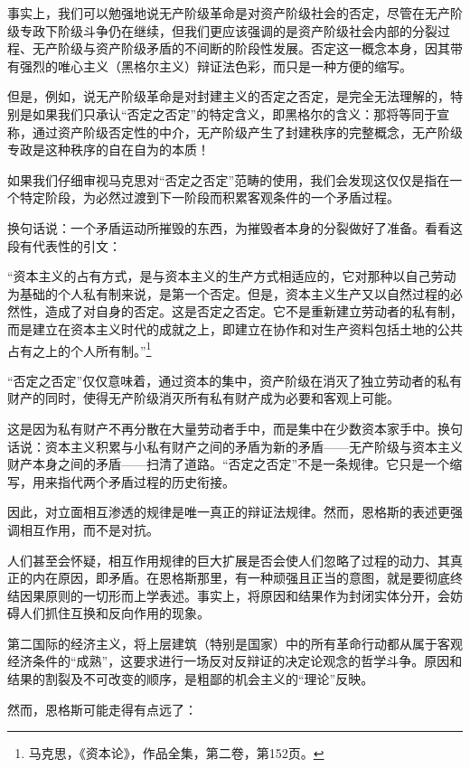 \documentclass[fontset=fandol, a4paper, 12pt, twoside]{ctexart}
\renewenvironment{quote}
  {\list{}{\rightmargin=0cm \leftmargin=2em}%
   \item\relax\small\kaishu\color{black}}
  {\endlist}
\begin{document}
事实上，我们可以勉强地说无产阶级革命是对资产阶级社会的否定，尽管在无产阶级专政下阶级斗争仍在继续，但我们更应该强调的是资产阶级社会内部的分裂过程、无产阶级与资产阶级矛盾的不间断的阶段性发展。否定这一概念本身，因其带有强烈的唯心主义（黑格尔主义）辩证法色彩，而只是一种方便的缩写。

但是，例如，说无产阶级革命是对封建主义的否定之否定，是完全无法理解的，特别是如果我们只承认“否定之否定”的特定含义，即黑格尔的含义：那将等同于宣称，通过资产阶级否定性的中介，无产阶级产生了封建秩序的完整概念，无产阶级专政是这种秩序的自在自为的本质！

如果我们仔细审视马克思对“否定之否定”范畴的使用，我们会发现这仅仅是指在一个特定阶段，为必然过渡到下一阶段而积累客观条件的一个矛盾过程。

换句话说：一个矛盾运动所摧毁的东西，为摧毁者本身的分裂做好了准备。看看这段有代表性的引文：

\begin{quote}
“资本主义的占有方式，是与资本主义的生产方式相适应的，它对那种以自己劳动为基础的个人私有制来说，是第一个否定。但是，资本主义生产又以自然过程的必然性，造成了对自身的否定。这是否定之否定。它不是重新建立劳动者的私有制，而是建立在资本主义时代的成就之上，即建立在协作和对生产资料包括土地的公共占有之上的个人所有制。”\footnote{马克思，《资本论》，作品全集，第二卷，第152页。}
\end{quote}

“否定之否定”仅仅意味着，通过资本的集中，资产阶级在消灭了独立劳动者的私有财产的同时，使得无产阶级消灭所有私有财产成为必要和客观上可能。

这是因为私有财产不再分散在大量劳动者手中，而是集中在少数资本家手中。换句话说：资本主义积累与小私有财产之间的矛盾为新的矛盾——无产阶级与资本主义财产本身之间的矛盾——扫清了道路。“否定之否定”不是一条规律。它只是一个缩写，用来指代两个矛盾过程的历史衔接。

因此，对立面相互渗透的规律是唯一真正的辩证法规律。然而，恩格斯的表述更强调相互作用，而不是对抗。

人们甚至会怀疑，相互作用规律的巨大扩展是否会使人们忽略了过程的动力、其真正的内在原因，即矛盾。在恩格斯那里，有一种顽强且正当的意图，就是要彻底终结因果原则的一切形而上学表述。事实上，将原因和结果作为封闭实体分开，会妨碍人们抓住互换和反向作用的现象。

第二国际的经济主义，将上层建筑（特别是国家）中的所有革命行动都从属于客观经济条件的“成熟”，这要求进行一场反对反辩证的决定论观念的哲学斗争。原因和结果的割裂及不可改变的顺序，是粗鄙的机会主义的“理论”反映。

然而，恩格斯可能走得有点远了：
\end{document}
